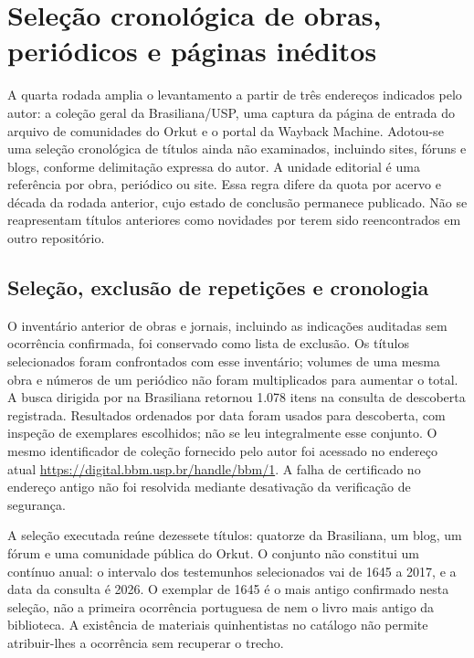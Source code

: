 \section{Seleção cronológica de obras, periódicos e páginas inéditos}

A quarta rodada amplia o levantamento a partir de três endereços indicados pelo autor: a coleção geral da Brasiliana/USP, uma captura da página de entrada do arquivo de comunidades do Orkut e o portal da Wayback Machine. Adotou-se uma seleção cronológica de títulos ainda não examinados, incluindo sites, fóruns e blogs, conforme delimitação expressa do autor. A unidade editorial é uma referência por obra, periódico ou site. Essa regra difere da quota por acervo e década da rodada anterior, cujo estado de conclusão permanece publicado. Não se reapresentam títulos anteriores como novidades por terem sido reencontrados em outro repositório.

\subsection{Seleção, exclusão de repetições e cronologia}

O inventário anterior de obras e jornais, incluindo as indicações auditadas sem ocorrência confirmada, foi conservado como lista de exclusão. Os títulos selecionados foram confrontados com esse inventário; volumes de uma mesma obra e números de um periódico não foram multiplicados para aumentar o total. A busca dirigida por  na Brasiliana retornou 1.078 itens na consulta de descoberta registrada. Resultados ordenados por data foram usados para descoberta, com inspeção de exemplares escolhidos; não se leu integralmente esse conjunto. O mesmo identificador de coleção fornecido pelo autor foi acessado no endereço atual \url{https://digital.bbm.usp.br/handle/bbm/1}. A falha de certificado no endereço antigo não foi resolvida mediante desativação da verificação de segurança.

A seleção executada reúne dezessete títulos: quatorze da Brasiliana, um blog, um fórum e uma comunidade pública do Orkut. O conjunto não constitui um contínuo anual: o intervalo dos testemunhos selecionados vai de 1645 a 2017, e a data da consulta é 2026. O exemplar de 1645 é o mais antigo confirmado nesta seleção, não a primeira ocorrência portuguesa de  nem o livro mais antigo da biblioteca. A existência de materiais quinhentistas no catálogo não permite atribuir-lhes a ocorrência sem recuperar o trecho.

